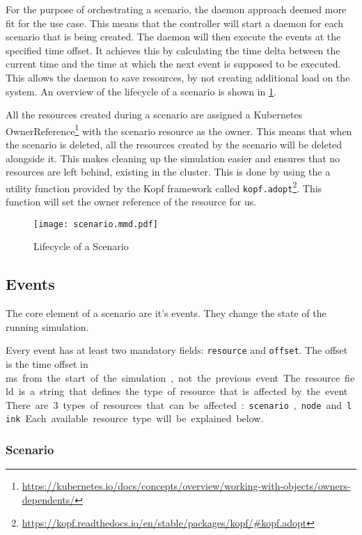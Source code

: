 For the purpose of orchestrating a scenario, the daemon approach deemed more fit for the use case. This means that the controller will start a daemon for each scenario that is being created. The daemon will then execute the events at the specified time offset. It achieves this by calculating the time delta between the current time and the time at which the next event is supposed to be executed. This allows the daemon to save resources, by not creating additional load on the system. An overview of the lifecycle of a scenario is shown in \ref{fig:scenario-lifecycle}.

All the resources created during a scenario are assigned a Kubernetes OwnerReference\footnote{\url{https://kubernetes.io/docs/concepts/overview/working-with-objects/owners-dependents/}} with the scenario resource as the owner. This means that when the scenario is deleted, all the resources created by the scenario will be deleted alongside it. This makes cleaning up the simulation easier and ensures that no resources are left behind, existing in the cluster. This is done by using the a utility function provided by the Kopf framework called \verb|kopf.adopt|\footnote{\url{https://kopf.readthedocs.io/en/stable/packages/kopf/\#kopf.adopt}}. This function will set the owner reference of the resource for us.

\begin{figure}[H]
  \label{fig:scenario-lifecycle}
  \caption{Lifecycle of a Scenario}
  \centering
  \texttt{[image: scenario.mmd.pdf]}
\end{figure}

\subsection{Events}

The core element of a scenario are it's events. They change the state of the running simulation.

Every event has at least two mandatory fields: \verb|resource| and \verb|offset|.
The offset is the time offset in \si\ms from the start of the simulation, not the previous event. The resource field is a string that defines the type of resource that is affected by the event.
There are 3 types of resources that can be affected: \verb|scenario|, \verb|node| and \verb|link|. Each available resource type will be explained below.

\subsubsection{Scenario}

